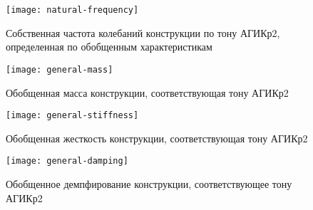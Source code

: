 \begin{figure}[!htb]
	\centering
	\texttt{[image: natural-frequency]}
	\caption{Собственная частота колебаний конструкции по тону АГИКр2, определенная по обобщенным характеристикам} \label{natural-frequency}
\end{figure}

\begin{figure}[H]
	\centering
	\texttt{[image: general-mass]}
	\caption{Обобщенная масса конструкции, соответствующая тону АГИКр2} \label{general-mass}
\end{figure}

\begin{figure}[!htb]
	\centering
	\texttt{[image: general-stiffness]}
	\caption{Обобщенная жесткость конструкции, соответствующая тону АГИКр2} \label{general-stiffness}
\end{figure}

\begin{figure}[!htb]
	\centering
	\texttt{[image: general-damping]}
	\caption{Обобщенное демпфирование конструкции, соответствующее тону АГИКр2} \label{general-damping}
\end{figure}

%